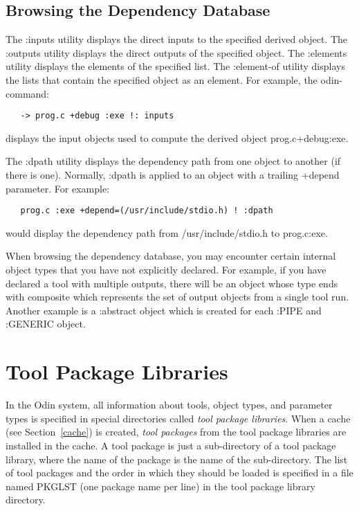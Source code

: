 \section{Browsing the Dependency Database}

The {\ex :inputs} utility displays the direct inputs to the
specified derived object.
The {\ex :outputs} utility displays the direct outputs of the
specified object.
The {\ex :elements} utility displays the elements of the
specified list.
The {\ex :element-of} utility displays the lists that contain
the specified object as an element.
For example, the odin-command:
\begin{verbatim}
   -> prog.c +debug :exe !: inputs
\end{verbatim}
displays the input objects used to compute the derived object
{\ex prog.c+debug:exe}.

The {\ex :dpath} utility displays the dependency path from one object
to another (if there is one).
Normally, {\ex :dpath} is applied to an object with a trailing
{\ex +depend} parameter.  For example:
\begin{verbatim}
   prog.c :exe +depend=(/usr/include/stdio.h) ! :dpath
\end{verbatim}
would display the dependency path from {\ex /usr/include/stdio.h} to
{\ex prog.c:exe}.

When browsing the dependency database, you may encounter certain internal
object types that you have not explicitly declared.  For example, if you have
declared a tool with multiple outputs, there will be an object whose
type ends with {\ex *composite} which represents the set of output
objects from a single tool run.  Another example is a {\ex :abstract}
object which is created for each {\ex :PIPE} and {\ex :GENERIC} object.


\chapter{Tool Package Libraries}
\label{library}


In the Odin system, all information about tools, object types,
and parameter types
is specified in special directories called {\em tool package libraries}.
When a cache (see Section~\ref{cache}) is created,
{\em tool packages} from the tool package libraries
are installed in the cache.
A tool package is just a sub-directory of a tool package library,
where the name of the package is the name of the sub-directory.
The list of tool packages and the order in which they should be loaded
is specified in a file named {\ex PKGLST} (one package name per line)
in the tool package library directory.

